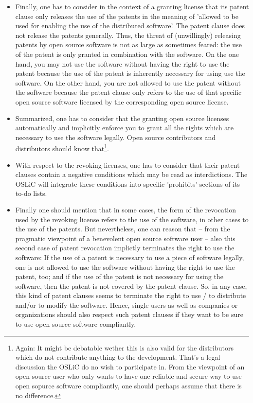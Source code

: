 \begin{itemize}
  \item Finally, one has to consider in the context of a granting license that
  its patent clause only releases the use of the patents in the meaning of
  'allowed to be used for enabling the use of the distributed software'. The
  patent clause does not release the patents generally. Thus, the threat of
  (unwillingly) releasing patents by open source software is not as large as
  sometimes feared: the use of the patent is only granted in combination with
  the software. On the one hand, you may not use the software without having the
  right to use the patent because the use of the patent is inherently necessary
  for using use the software. On the other hand, you are not allowed to use the
  patent without the software because the patent clause only refers to the use
  of that specific open source software licensed by the corresponding open
  source license.

  \item Summarized, one has to consider that the granting open source licenses
  automatically and implicitly enforce you to grant all the rights which are
  necessary to use the software legally. Open source contributors and
  distributors should know that\footnote{Again: It might be debatable wether
  this is also valid for the distributors which do not contribute anything to
  the development. That's a legal discussion the OSLiC do no wish to participate
  in. From the viewpoint of an open source user who only wants to have one
  reliable and secure way to use open sopurce software compliantly, one should
  perhaps assume that there is no difference.}.

  \item With respect to the revoking licenses, one has to consider that their
  patent clauses contain a negative conditions which may be read as
  interdictions. The OSLiC will integrate these conditions into specific
  'prohibits'-sections of its to-do lists.
  
  \item Finally one should mention that in some cases, the form of the
  revocation used by the revoking license refers to the use of the software, in
  other cases to the use of the patents. But nevertheless, one can reason that
  -- from the pragmatic viewpoint of a benevolent open source software user --
  also this second case of patent revocation implictly terminates the right to
  use the software: If the use of a patent is necessary to use a piece of
  software legally, one is not allowed to use the software without having the
  right to use the patent, too; and if the use of the patent is not necessary
  for using the software, then the patent is not covered by the patent clause.
  So, in any case, this kind of patent clauses seems to terminate the right to
  use / to distribute and/or to modify the software. Hence, single users as well
  as companies or organizations should also respect such patent clauses if they
  want to be sure to use open source software compliantly.
\end{itemize}

